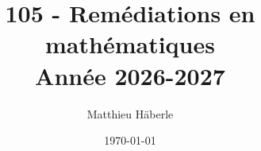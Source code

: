 \documentclass[a4paper, 12pt]{report}
\title{
	{\Huge 105 - Remédiations en mathématiques \\ }
	{\huge Année 2026-2027}
}
\author{\Large{Matthieu Häberle}}
\date{\today}
\begin{document}
\maketitle
\newpage
\twocolstableofcontents
\pagebreak











%
%
%
%
%
%
%
%
%


\end{document}
